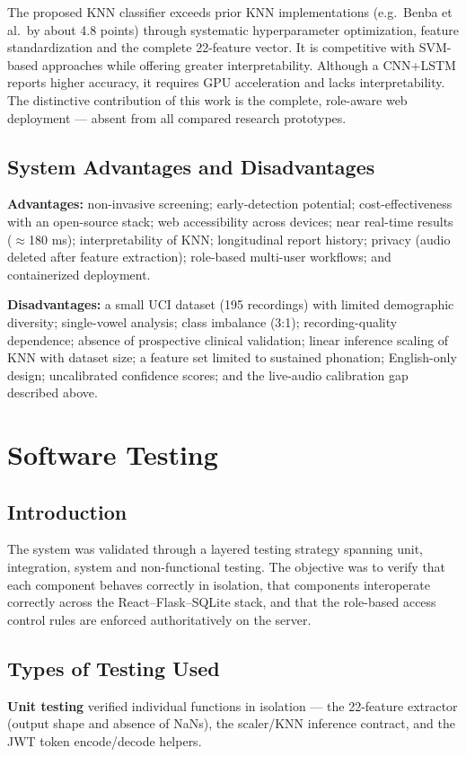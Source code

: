 \documentclass[oneside,a4paper,12pt]{report}
\begin{document}
The proposed KNN classifier exceeds prior KNN implementations (e.g.\ Benba et al.\
by about 4.8 points) through systematic hyperparameter optimization, feature
standardization and the complete 22-feature vector. It is competitive with
SVM-based approaches while offering greater interpretability. Although a CNN+LSTM
reports higher accuracy, it requires GPU acceleration and lacks interpretability.
The distinctive contribution of this work is the complete, role-aware web
deployment --- absent from all compared research prototypes.

\section{System Advantages and Disadvantages}
\textbf{Advantages:} non-invasive screening; early-detection potential;
cost-effectiveness with an open-source stack; web accessibility across devices;
near real-time results ($\approx$180 ms); interpretability of KNN; longitudinal
report history; privacy (audio deleted after feature extraction); role-based
multi-user workflows; and containerized deployment.

\textbf{Disadvantages:} a small UCI dataset (195 recordings) with limited
demographic diversity; single-vowel analysis; class imbalance (3:1);
recording-quality dependence; absence of prospective clinical validation; linear
inference scaling of KNN with dataset size; a feature set limited to sustained
phonation; English-only design; uncalibrated confidence scores; and the
live-audio calibration gap described above.

\chapter{Software Testing}

\section{Introduction}
The system was validated through a layered testing strategy spanning unit,
integration, system and non-functional testing. The objective was to verify that
each component behaves correctly in isolation, that components interoperate
correctly across the React--Flask--SQLite stack, and that the role-based access
control rules are enforced authoritatively on the server.

\section{Types of Testing Used}
\textbf{Unit testing} verified individual functions in isolation --- the
22-feature extractor (output shape and absence of NaNs), the scaler/KNN inference
contract, and the JWT token encode/decode helpers.
\end{document}
